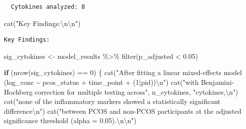\documentclass[
  letterpaper,
  DIV=11,
  numbers=noendperiod]{scrartcl}
\newenvironment{Shaded}{\begin{snugshade}}{\end{snugshade}}
\newcommand{\ControlFlowTok}[1]{\textcolor[rgb]{0.00,0.23,0.31}{\textbf{#1}}}
\newcommand{\DecValTok}[1]{\textcolor[rgb]{0.68,0.00,0.00}{#1}}
\newcommand{\FloatTok}[1]{\textcolor[rgb]{0.68,0.00,0.00}{#1}}
\newcommand{\FunctionTok}[1]{\textcolor[rgb]{0.28,0.35,0.67}{#1}}
\newcommand{\NormalTok}[1]{\textcolor[rgb]{0.00,0.23,0.31}{#1}}
\newcommand{\OtherTok}[1]{\textcolor[rgb]{0.00,0.23,0.31}{#1}}
\newcommand{\SpecialCharTok}[1]{\textcolor[rgb]{0.37,0.37,0.37}{#1}}
\newcommand{\StringTok}[1]{\textcolor[rgb]{0.13,0.47,0.30}{#1}}
\newcounter{none} %
\begin{document}
\begin{verbatim}
  Cytokines analyzed: 8 
\end{verbatim}

\begin{Shaded}
\begin{Highlighting}[]
\FunctionTok{cat}\NormalTok{(}\StringTok{"Key Findings:}\SpecialCharTok{\textbackslash{}n\textbackslash{}n}\StringTok{"}\NormalTok{)}
\end{Highlighting}
\end{Shaded}

\begin{verbatim}
Key Findings:
\end{verbatim}

\begin{Shaded}
\begin{Highlighting}[]
\NormalTok{sig\_cytokines }\OtherTok{\textless{}{-}}\NormalTok{ model\_results }\SpecialCharTok{\%\textgreater{}\%}
  \FunctionTok{filter}\NormalTok{(p\_adjusted }\SpecialCharTok{\textless{}} \FloatTok{0.05}\NormalTok{)}

\ControlFlowTok{if}\NormalTok{ (}\FunctionTok{nrow}\NormalTok{(sig\_cytokines) }\SpecialCharTok{==} \DecValTok{0}\NormalTok{) \{}
  \FunctionTok{cat}\NormalTok{(}\StringTok{"After fitting a linear mixed{-}effects model (log\_conc \textasciitilde{} pcos\_status + time\_point + (1|pid))}\SpecialCharTok{\textbackslash{}n}\StringTok{"}\NormalTok{)}
  \FunctionTok{cat}\NormalTok{(}\StringTok{"with Benjamini{-}Hochberg correction for multiple testing across"}\NormalTok{, n\_cytokines, }\StringTok{"cytokines,}\SpecialCharTok{\textbackslash{}n}\StringTok{"}\NormalTok{)}
  \FunctionTok{cat}\NormalTok{(}\StringTok{"none of the inflammatory markers showed a statistically significant difference}\SpecialCharTok{\textbackslash{}n}\StringTok{"}\NormalTok{)}
  \FunctionTok{cat}\NormalTok{(}\StringTok{"between PCOS and non{-}PCOS participants at the adjusted significance threshold (alpha = 0.05).}\SpecialCharTok{\textbackslash{}n\textbackslash{}n}\StringTok{"}\NormalTok{)}


\end{Highlighting}
\end{Shaded}
\end{document}
